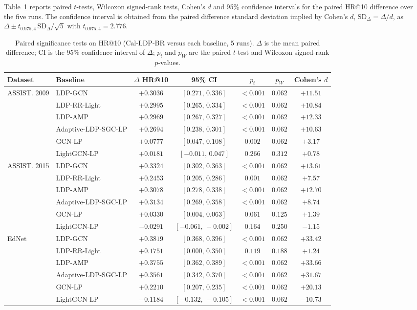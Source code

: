 \documentclass[pdflatex,sn-basic,Numbered]{sn-jnl}
\theoremstyle{plain}
\theoremstyle{remark}
\theoremstyle{definition}
\begin{document}
Table~\ref{tab:sig} reports paired $t$-tests, Wilcoxon signed-rank tests, Cohen's $d$ and 95\% confidence intervals for the paired HR@10 difference over the five runs. The confidence interval is obtained from the paired difference standard deviation implied by Cohen's $d$, $\mathrm{SD}_{\Delta}=\Delta/d$, as $\Delta\pm t_{0.975,4}\,\mathrm{SD}_{\Delta}/\sqrt{5}$ with $t_{0.975,4}=2.776$.

\begin{table}[t]
\caption{Paired significance tests on HR@10 (Cal-LDP-BR versus each baseline, 5 runs). $\Delta$ is the mean paired difference; CI is the 95\% confidence interval of $\Delta$; $p_t$ and $p_W$ are the paired $t$-test and Wilcoxon signed-rank $p$-values.}
\label{tab:sig}
\footnotesize
\setlength{\tabcolsep}{3.4pt}
\begin{tabular}{@{}llccccc@{}}
\toprule
Dataset & Baseline & $\Delta$ HR@10 & 95\% CI & $p_t$ & $p_W$ & Cohen's $d$ \\
\midrule
ASSIST. 2009 & LDP-GCN & $+0.3036$ & $[0.271,\,0.336]$ & $<0.001$ & $0.062$ & $+11.51$ \\
 & LDP-RR-Light & $+0.2995$ & $[0.265,\,0.334]$ & $<0.001$ & $0.062$ & $+10.84$ \\
 & LDP-AMP & $+0.2969$ & $[0.267,\,0.327]$ & $<0.001$ & $0.062$ & $+12.33$ \\
 & Adaptive-LDP-SGC-LP & $+0.2694$ & $[0.238,\,0.301]$ & $<0.001$ & $0.062$ & $+10.63$ \\
 & GCN-LP & $+0.0777$ & $[0.047,\,0.108]$ & $0.002$ & $0.062$ & $+3.17$ \\
 & LightGCN-LP & $+0.0181$ & $[-0.011,\,0.047]$ & $0.266$ & $0.312$ & $+0.78$ \\
ASSIST. 2015 & LDP-GCN & $+0.3324$ & $[0.302,\,0.363]$ & $<0.001$ & $0.062$ & $+13.61$ \\
 & LDP-RR-Light & $+0.2453$ & $[0.205,\,0.286]$ & $0.001$ & $0.062$ & $+7.57$ \\
 & LDP-AMP & $+0.3078$ & $[0.278,\,0.338]$ & $<0.001$ & $0.062$ & $+12.70$ \\
 & Adaptive-LDP-SGC-LP & $+0.3134$ & $[0.269,\,0.358]$ & $<0.001$ & $0.062$ & $+8.74$ \\
 & GCN-LP & $+0.0330$ & $[0.004,\,0.063]$ & $0.061$ & $0.125$ & $+1.39$ \\
 & LightGCN-LP & $-0.0291$ & $[-0.061,\,-0.002]$ & $0.164$ & $0.250$ & $-1.15$ \\
EdNet & LDP-GCN & $+0.3819$ & $[0.368,\,0.396]$ & $<0.001$ & $0.062$ & $+33.42$ \\
 & LDP-RR-Light & $+0.1751$ & $[0.000,\,0.350]$ & $0.119$ & $0.188$ & $+1.24$ \\
 & LDP-AMP & $+0.3755$ & $[0.362,\,0.389]$ & $<0.001$ & $0.062$ & $+33.66$ \\
 & Adaptive-LDP-SGC-LP & $+0.3561$ & $[0.342,\,0.370]$ & $<0.001$ & $0.062$ & $+31.67$ \\
 & GCN-LP & $+0.2210$ & $[0.207,\,0.235]$ & $<0.001$ & $0.062$ & $+20.13$ \\
 & LightGCN-LP & $-0.1184$ & $[-0.132,\,-0.105]$ & $<0.001$ & $0.062$ & $-10.73$ \\
\bottomrule
\end{tabular}


\end{table}
\end{document}
